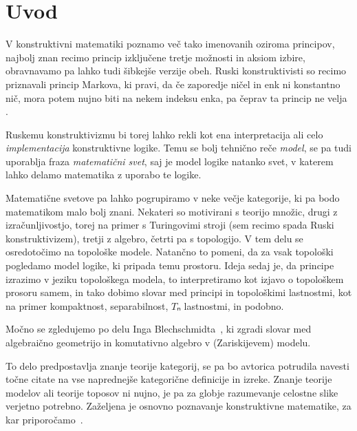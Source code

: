 \section{Uvod}

V konstruktivni matematiki poznamo več tako imenovanih 
oziroma  principov, najbolj znan recimo princip izključene
tretje možnosti in aksiom izbire, obravnavamo pa lahko tudi šibkejše verzije
obeh. Ruski konstruktivisti so recimo priznavali princip Markova, ki pravi, da
če zaporedje ničel in enk ni konstantno nič, mora potem nujno biti na nekem
indeksu enka, pa čeprav ta princip ne velja .

Ruskemu konstruktivizmu bi torej lahko rekli kot ena interpretacija ali celo
\emph{implementacija} konstruktivne logike. Temu se bolj tehnično reče
\emph{model}, se pa tudi uporablja fraza \emph{matematični svet}, saj je model
logike natanko svet, v katerem lahko delamo matematika z uporabo te logike.

Matematične svetove pa lahko pogrupiramo v neke večje kategorije, ki pa bodo
matematikom malo bolj znani. Nekateri so motivirani s teorijo množic, drugi z
izračunljivostjo, torej na primer s Turingovimi stroji (sem recimo spada Ruski
konstruktivizem), tretji z algebro, četrti pa s topologijo. V tem delu se
osredotočimo na topološke modele. Natančno to pomeni, da za vsak topološki
pogledamo model logike, ki pripada temu prostoru. Ideja sedaj je, da
 principe izrazimo v jeziku topološkega modela, to interpretiramo
kot izjavo o topološkem prosoru samem, in tako dobimo slovar med
 principi in topološkimi lastnostmi, kot na primer kompaktnost,
separabilnost, \(Tₙ\) lastnostmi, in podobno.

Močno se zgledujemo po delu Inga Blechschmidta~\cite{Blechschmidt17,
  Blechschmidt18, Blechschmidt20, Blechschmidt22}, ki zgradi slovar med
algebraično geometrijo in komutativno algebro v (Zariskijevem) modelu.

To delo predpostavlja znanje teorije kategorij, se pa bo avtorica potrudila
navesti točne citate na vse naprednejše kategorične definicije in izreke. Znanje
teorije modelov ali teorije toposov ni nujno, je pa za globje razumevanje
celostne slike verjetno potrebno. Zaželjena je osnovno poznavanje konstruktivne
matematike, za kar priporočamo~\cite{Bauer16, Greenleaf20, Bishop85}.

